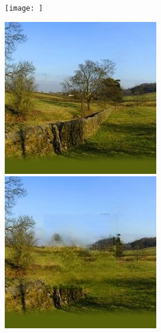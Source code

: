\documentclass[a4paper, 11pt]{article}
\begin{document}
\begin{figure}
\begin{minipage}{.3\textwidth}
    \end{minipage}
    \begin{minipage}{.3\textwidth}
      \centering
      \texttt{[image: ]}
    \end{minipage}
\end{figure}

\begin{figure}
    \centering
    \begin{minipage}{.3\textwidth}
      \centering
      \includegraphics[width=.95\linewidth]{documentation/img/hayfield.jpg}
    \end{minipage}%
    \begin{minipage}{.3\textwidth}
      \centering
      \includegraphics[width=.95\linewidth]{documentation/img/hayfield_out_45k.png}

\end{minipage}
\end{figure}
\end{document}
